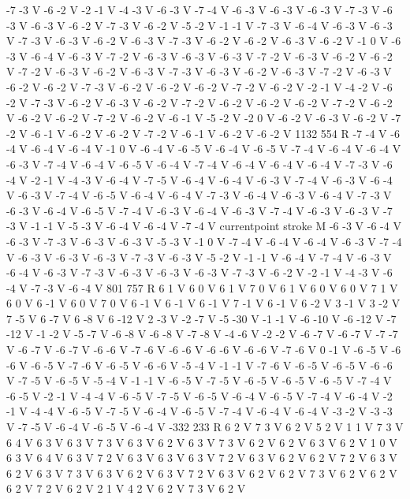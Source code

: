 {-7 -3 V
-6 -2 V
-2 -1 V
-4 -3 V
-6 -3 V
-7 -4 V
-6 -3 V
-6 -3 V
-6 -3 V
-7 -3 V
-6 -3 V
-6 -3 V
-6 -2 V
-7 -3 V
-6 -2 V
-5 -2 V
-1 -1 V
-7 -3 V
-6 -4 V
-6 -3 V
-6 -3 V
-7 -3 V
-6 -3 V
-6 -2 V
-6 -3 V
-7 -3 V
-6 -2 V
-6 -2 V
-6 -3 V
-6 -2 V
-1 0 V
-6 -3 V
-6 -4 V
-6 -3 V
-7 -2 V
-6 -3 V
-6 -3 V
-6 -3 V
-7 -2 V
-6 -3 V
-6 -2 V
-6 -2 V
-7 -2 V
-6 -3 V
-6 -2 V
-6 -3 V
-7 -3 V
-6 -3 V
-6 -2 V
-6 -3 V
-7 -2 V
-6 -3 V
-6 -2 V
-6 -2 V
-7 -3 V
-6 -2 V
-6 -2 V
-6 -2 V
-7 -2 V
-6 -2 V
-2 -1 V
-4 -2 V
-6 -2 V
-7 -3 V
-6 -2 V
-6 -3 V
-6 -2 V
-7 -2 V
-6 -2 V
-6 -2 V
-6 -2 V
-7 -2 V
-6 -2 V
-6 -2 V
-6 -2 V
-7 -2 V
-6 -2 V
-6 -1 V
-5 -2 V
-2 0 V
-6 -2 V
-6 -3 V
-6 -2 V
-7 -2 V
-6 -1 V
-6 -2 V
-6 -2 V
-7 -2 V
-6 -1 V
-6 -2 V
-6 -2 V
1132 554 R
-7 -4 V
-6 -4 V
-6 -4 V
-6 -4 V
-1 0 V
-6 -4 V
-6 -5 V
-6 -4 V
-6 -5 V
-7 -4 V
-6 -4 V
-6 -4 V
-6 -3 V
-7 -4 V
-6 -4 V
-6 -5 V
-6 -4 V
-7 -4 V
-6 -4 V
-6 -4 V
-6 -4 V
-7 -3 V
-6 -4 V
-2 -1 V
-4 -3 V
-6 -4 V
-7 -5 V
-6 -4 V
-6 -4 V
-6 -3 V
-7 -4 V
-6 -3 V
-6 -4 V
-6 -3 V
-7 -4 V
-6 -5 V
-6 -4 V
-6 -4 V
-7 -3 V
-6 -4 V
-6 -3 V
-6 -4 V
-7 -3 V
-6 -3 V
-6 -4 V
-6 -5 V
-7 -4 V
-6 -3 V
-6 -4 V
-6 -3 V
-7 -4 V
-6 -3 V
-6 -3 V
-7 -3 V
-1 -1 V
-5 -3 V
-6 -4 V
-6 -4 V
-7 -4 V
currentpoint stroke M
-6 -3 V
-6 -4 V
-6 -3 V
-7 -3 V
-6 -3 V
-6 -3 V
-5 -3 V
-1 0 V
-7 -4 V
-6 -4 V
-6 -4 V
-6 -3 V
-7 -4 V
-6 -3 V
-6 -3 V
-6 -3 V
-7 -3 V
-6 -3 V
-5 -2 V
-1 -1 V
-6 -4 V
-7 -4 V
-6 -3 V
-6 -4 V
-6 -3 V
-7 -3 V
-6 -3 V
-6 -3 V
-6 -3 V
-7 -3 V
-6 -2 V
-2 -1 V
-4 -3 V
-6 -4 V
-7 -3 V
-6 -4 V
801 757 R
6 1 V
6 0 V
6 1 V
7 0 V
6 1 V
6 0 V
6 0 V
7 1 V
6 0 V
6 -1 V
6 0 V
7 0 V
6 -1 V
6 -1 V
6 -1 V
7 -1 V
6 -1 V
6 -2 V
3 -1 V
3 -2 V
7 -5 V
6 -7 V
6 -8 V
6 -12 V
2 -3 V
-2 -7 V
-5 -30 V
-1 -1 V
-6 -10 V
-6 -12 V
-7 -12 V
-1 -2 V
-5 -7 V
-6 -8 V
-6 -8 V
-7 -8 V
-4 -6 V
-2 -2 V
-6 -7 V
-6 -7 V
-7 -7 V
-6 -7 V
-6 -7 V
-6 -6 V
-7 -6 V
-6 -6 V
-6 -6 V
-6 -6 V
-7 -6 V
0 -1 V
-6 -5 V
-6 -6 V
-6 -5 V
-7 -6 V
-6 -5 V
-6 -6 V
-5 -4 V
-1 -1 V
-7 -6 V
-6 -5 V
-6 -5 V
-6 -6 V
-7 -5 V
-6 -5 V
-5 -4 V
-1 -1 V
-6 -5 V
-7 -5 V
-6 -5 V
-6 -5 V
-6 -5 V
-7 -4 V
-6 -5 V
-2 -1 V
-4 -4 V
-6 -5 V
-7 -5 V
-6 -5 V
-6 -4 V
-6 -5 V
-7 -4 V
-6 -4 V
-2 -1 V
-4 -4 V
-6 -5 V
-7 -5 V
-6 -4 V
-6 -5 V
-7 -4 V
-6 -4 V
-6 -4 V
-3 -2 V
-3 -3 V
-7 -5 V
-6 -4 V
-6 -5 V
-6 -4 V
-332 233 R
6 2 V
7 3 V
6 2 V
5 2 V
1 1 V
7 3 V
6 4 V
6 3 V
6 3 V
7 3 V
6 3 V
6 2 V
6 3 V
7 3 V
6 2 V
6 2 V
6 3 V
6 2 V
1 0 V
6 3 V
6 4 V
6 3 V
7 2 V
6 3 V
6 3 V
6 3 V
7 2 V
6 3 V
6 2 V
6 2 V
7 2 V
6 3 V
6 2 V
6 3 V
7 3 V
6 3 V
6 2 V
6 3 V
7 2 V
6 3 V
6 2 V
6 2 V
7 3 V
6 2 V
6 2 V
6 2 V
7 2 V
6 2 V
2 1 V
4 2 V
6 2 V
7 3 V
6 2 V
}
